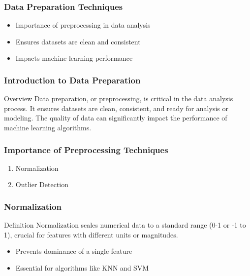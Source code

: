 \documentclass[aspectratio=169]{beamer}
\begin{document}
\begin{frame}[fragile]
    \frametitle{Data Preparation Techniques}
    \begin{itemize}
        \item Importance of preprocessing in data analysis
        \item Ensures datasets are clean and consistent
        \item Impacts machine learning performance
    \end{itemize}
\end{frame}

\begin{frame}[fragile]
    \frametitle{Introduction to Data Preparation}
    \begin{block}{Overview}
        Data preparation, or preprocessing, is critical in the data analysis process. It ensures datasets are clean, consistent, and ready for analysis or modeling. The quality of data can significantly impact the performance of machine learning algorithms.
    \end{block}
\end{frame}

\begin{frame}[fragile]
    \frametitle{Importance of Preprocessing Techniques}
    \begin{enumerate}
        \item Normalization
        \item Outlier Detection
    \end{enumerate}
\end{frame}

\begin{frame}[fragile]
    \frametitle{Normalization}
    \begin{block}{Definition}
        Normalization scales numerical data to a standard range (0-1 or -1 to 1), crucial for features with different units or magnitudes.
    \end{block}
    \begin{itemize}
        \item Prevents dominance of a single feature
        \item Essential for algorithms like KNN and SVM
    \end{itemize}
\end{frame}
\end{document}
